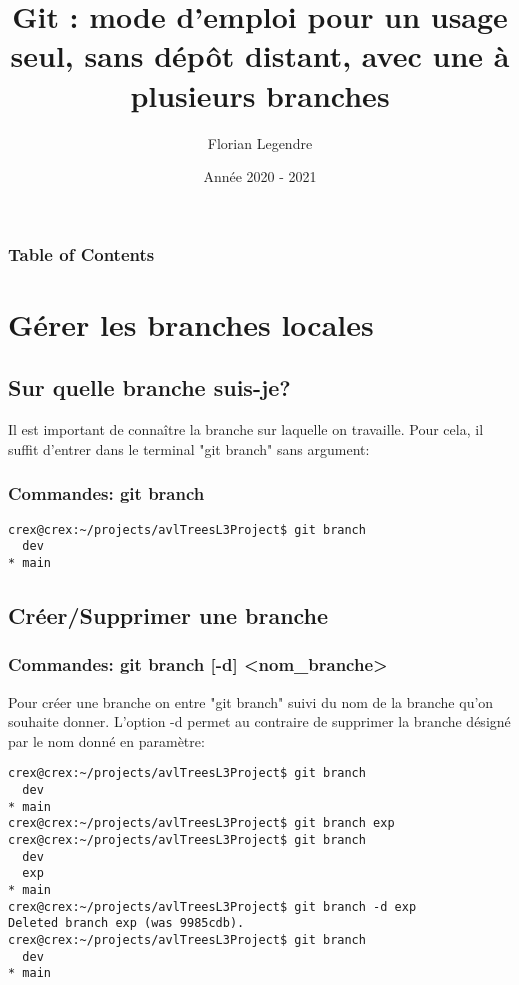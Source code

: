 \documentclass{beamer}
\title[Git seul en local mono-branche]{Git : mode d'emploi pour un usage seul, sans dépôt distant, avec une à plusieurs branches}
\author{Florian Legendre}
\institute{Université de Poitiers}
\date{Année 2020 - 2021}
\begin{document}
\frame{\titlepage}

\begin{frame}
\frametitle{Table of Contents}
\tableofcontents[hideallsubsections]
\end{frame}


\section{Gérer les branches locales}

\subsection{Sur quelle branche suis-je?}
\begin{frame}[fragile]
Il est important de connaître la branche sur laquelle on travaille. Pour cela, il suffit d'entrer dans le terminal "git branch" sans argument:
\frametitle{Commandes: git branch}
\begin{mdframed}[style=Bash]
    \begin{lstlisting}[style=Bash, caption={Exemple d'affichage de la commande "git branch"}]
crex@crex:~/projects/avlTreesL3Project$ git branch
  dev
* main
    \end{lstlisting}
\end{mdframed}
\end{frame}

\subsection{Créer/Supprimer une branche}
\begin{frame}[fragile]
\frametitle{Commandes: git branch [-d] <nom\_branche>}
Pour créer une branche on entre "git branch" suivi du nom de la branche qu'on souhaite donner. L'option -d permet au contraire de supprimer la branche désigné par le nom donné en paramètre:

\begin{mdframed}[style=Bash]
    \begin{lstlisting}[style=Bash, caption={Exemple de création et de suppression de branche}]
crex@crex:~/projects/avlTreesL3Project$ git branch
  dev
* main
crex@crex:~/projects/avlTreesL3Project$ git branch exp
crex@crex:~/projects/avlTreesL3Project$ git branch
  dev
  exp
* main
crex@crex:~/projects/avlTreesL3Project$ git branch -d exp
Deleted branch exp (was 9985cdb).
crex@crex:~/projects/avlTreesL3Project$ git branch
  dev
* main
    \end{lstlisting}
\end{mdframed}

\end{frame}
\end{document}
